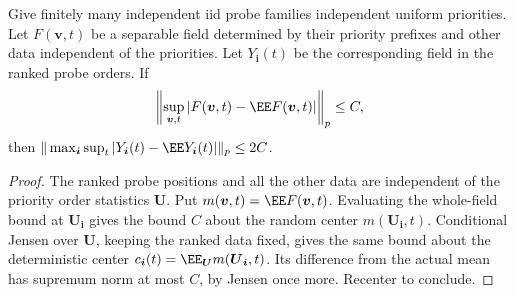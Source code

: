 \documentclass[11pt,letterpaper]{article}
\begin{document}
\begin{lemma}
\label{lem:ranking-maximal-transfer}
Give finitely many independent iid probe families independent
uniform priorities. Let $F(\boldsymbol v,t)$ be a separable
field determined by their priority prefixes and other data
independent of the priorities. Let $Y_{\boldsymbol i}(t)$
be the corresponding field in the ranked probe orders.
If
\[
 \left\|\sup_{\boldsymbol v,t}
       |F(\boldsymbol v,t)-\EE F(\boldsymbol v,t)|\right\|_p
                                                        \le C,
\]
then
$\|\max_{\boldsymbol i}\sup_t
       |Y_{\boldsymbol i}(t)-\EE Y_{\boldsymbol i}(t)|\|_p\le2C$.
\end{lemma}
\begin{proof}
The ranked probe positions and all the other data are
independent of the priority order statistics $\boldsymbol U$.
Put $m(\boldsymbol v,t)=\EE F(\boldsymbol v,t)$.
Evaluating the whole-field bound at $\boldsymbol U_{\boldsymbol i}$
gives the bound $C$ about the random center
$m(\boldsymbol U_{\boldsymbol i},t)$.
Conditional Jensen over $\boldsymbol U$, keeping the ranked
data fixed, gives the same bound about the deterministic
center $c_{\boldsymbol i}(t)=
\EE_{\boldsymbol U}m(\boldsymbol U_{\boldsymbol i},t)$.
Its difference from the actual mean has supremum norm
at most $C$, by Jensen once more. Recenter to conclude.
\end{proof}
\end{document}
